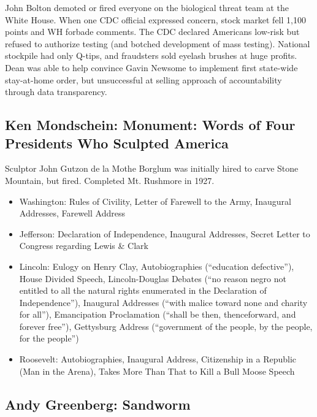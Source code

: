 \documentclass[
]{article}
\begin{document}
John Bolton demoted or fired everyone on the biological threat team at
the White House. When one CDC official expressed concern, stock market
fell 1,100 points and WH forbade comments. The CDC declared Americans
low-risk but refused to authorize testing (and botched development of
mass testing). National stockpile had only Q-tips, and fraudsters sold
eyelash brushes at huge profits. Dean was able to help convince Gavin
Newsome to implement first state-wide stay-at-home order, but
unsuccessful at selling approach of accountability through data
transparency.

\hypertarget{ken-mondschein-monument-words-of-four-presidents-who-sculpted-america}{%
\subsection{Ken Mondschein: Monument: Words of Four Presidents Who
Sculpted
America}\label{ken-mondschein-monument-words-of-four-presidents-who-sculpted-america}}

Sculptor John Gutzon de la Mothe Borglum was initially hired to carve
Stone Mountain, but fired. Completed Mt. Rushmore in 1927.

\begin{itemize}
\item
  Washington: Rules of Civility, Letter of Farewell to the Army,
  Inaugural Addresses, Farewell Address
\item
  Jefferson: Declaration of Independence, Inaugural Addresses, Secret
  Letter to Congress regarding Lewis \& Clark
\item
  Lincoln: Eulogy on Henry Clay, Autobiographies (``education
  defective''), House Divided Speech, Lincoln-Douglas Debates (``no
  reason negro not entitled to all the natural rights enumerated in the
  Declaration of Independence''), Inaugural Addresses (``with malice
  toward none and charity for all''), Emancipation Proclamation (``shall
  be then, thenceforward, and forever free''), Gettysburg Address
  (``government of the people, by the people, for the people'')
\item
  Roosevelt: Autobiographies, Inaugural Address, Citizenship in a
  Republic (Man in the Arena), Takes More Than That to Kill a Bull Moose
  Speech
\end{itemize}

\hypertarget{andy-greenberg-sandworm}{%
\subsection{Andy Greenberg: Sandworm}\label{andy-greenberg-sandworm}}
\end{document}
